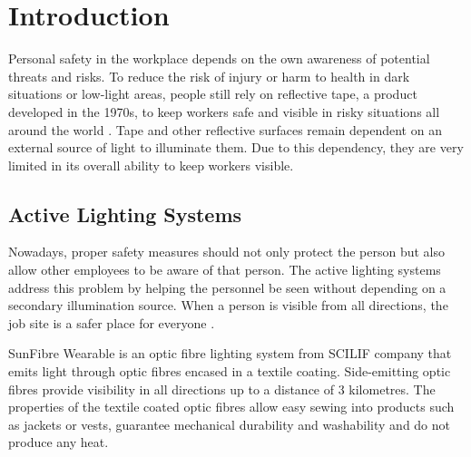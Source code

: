 \chapter{Introduction}
    Personal safety in the workplace depends on the own awareness of potential threats and risks. To reduce the risk of injury or harm to health in dark situations or low-light areas, people still rely on reflective tape, a product developed in the 1970s, to keep workers safe and visible in risky situations all around the world \cite{web_article:active_lighting_systems}. 
    Tape and other reflective surfaces remain dependent on an external source of light to illuminate them. Due to this dependency, they are very limited in its overall ability to keep workers visible.
    
\section{Active Lighting Systems}
    Nowadays, proper safety measures should not only protect the person but also allow other employees to be aware of that person. The active lighting systems address this problem by helping the personnel be seen without depending on a secondary illumination source. When a person is visible from all directions, the job site is a safer place for everyone \cite{web_article:active_lighting_systems}. 
 
    SunFibre Wearable is an optic fibre lighting system from SCILIF company that emits light through optic fibres encased in a textile coating. Side-emitting optic fibres provide visibility in all directions up to a distance of 3 kilometres. The properties of the textile coated optic fibres allow easy sewing into products such as jackets or vests, guarantee mechanical durability and washability and do not produce any heat.
    
